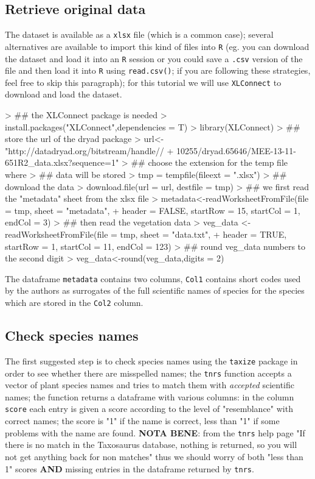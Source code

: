 \documentclass{article}
\begin{document}
 
\subsection{Retrieve original data}

   The dataset is available as a \texttt{xlsx} file (which is a common
   case); several alternatives are available to import this kind of files into \texttt{R} (eg. you can download the
   dataset and load it into an \texttt{R} session or you could save
   a \texttt{.csv} version of the file and then load it into
   \texttt{R} using \texttt{read.csv()}; if you are following these strategies, feel free to skip this paragraph); for this tutorial we will use
   \texttt{XLConnect} to download and load the dataset.

\begin{Schunk}
\begin{Sinput}
> ## the XLConnect package is needed
> install.packages("XLConnect",dependencies = T)
> library(XLConnect)
> ## store the  url of the dryad package
> url<-"http://datadryad.org/bitstream/handle//
+     10255/dryad.65646/MEE-13-11-651R2_data.xlsx?sequence=1"
> ## choose the extension for the temp file where 
> ## data will be stored
> tmp = tempfile(fileext = ".xlsx")
> ## download the data
> download.file(url = url, destfile = tmp)
> ## we first read the "metadata" sheet from the xlsx file
> metadata<-readWorksheetFromFile(file = tmp, sheet = "metadata", 
+  header = FALSE, startRow = 15, startCol = 1, endCol = 3)
> ## then read the vegetation data
> veg_data <-readWorksheetFromFile(file = tmp, sheet = "data.txt", 
+        header = TRUE, startRow = 1, startCol = 11, endCol = 123)
> ## round veg_data numbers to the second digit
> veg_data<-round(veg_data,digits = 2)
\end{Sinput}
\end{Schunk}
 
  The dataframe \texttt{metadata} contains two columns, \texttt{Col1}
  contains short codes used by the authors as surrogates of the full
  scientific names of species  for the species which are stored in the
  \texttt{Col2} column.

\subsection{Check species names}

  The first suggested step is to check species names using the
  \texttt{taxize} package in order to see whether there are
  misspelled names; the \texttt{tnrs} function accepts a vector of
  plant species names and tries to match them with \textit{accepted}
  scientific names; the function
  returns a dataframe with various columns: in the column
  \texttt{score} each entry is given a score according to the level of
  "resemblance" with correct names; the score is "1" if the name is
  correct, less than "1" if some problems with the name are
  found. \textbf{NOTA BENE}: from the \texttt{tnrs} help page "If there
  is no match in the Taxosaurus database, nothing is returned, so you
  will not get anything back for non matches" thus we should worry of
  both "less than 1" scores \textbf{AND} missing entries in the
  dataframe returned by \texttt{tnrs}.
  
\end{document}
